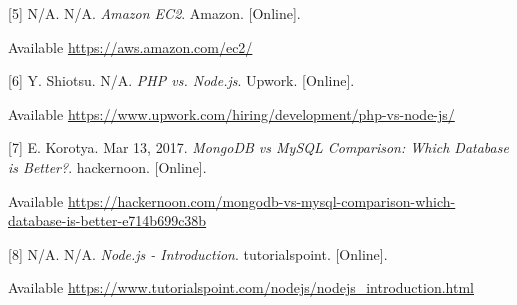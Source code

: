 \documentclass[onecolumn, draftclsnofoot,10pt, compsoc]{IEEEtran}
\begin{document}
[5] N/A. N/A. \textit{Amazon EC2}. Amazon. [Online].

Available \url{https://aws.amazon.com/ec2/}

[6] Y. Shiotsu. N/A. \textit{PHP vs. Node.js}. Upwork. [Online].

Available \url{https://www.upwork.com/hiring/development/php-vs-node-js/}

[7] E. Korotya. Mar 13, 2017. \textit{MongoDB vs MySQL Comparison: Which Database is Better?}. hackernoon. [Online].

Available \url{https://hackernoon.com/mongodb-vs-mysql-comparison-which-database-is-better-e714b699c38b}

[8] N/A. N/A. \textit{Node.js - Introduction}. tutorialspoint. [Online].

Available \url{https://www.tutorialspoint.com/nodejs/nodejs_introduction.html}
\end{document}

